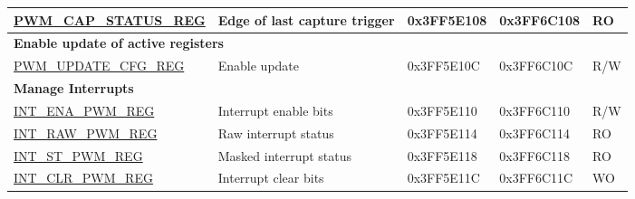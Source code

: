 \begin{longtable}{ | p{5.5cm} | p{5.7cm} | p{2cm} | p{2cm} | p{0.8cm} | }
\hyperref[regdesc:PWMCAPSTATUSREG]{PWM\_CAP\_STATUS\_REG} & Edge of last capture trigger & 0x3FF5E108 & 0x3FF6C108 & RO \\ \hline
\multicolumn{5}{|l|}{\textbf{Enable update of active registers}} \\ \hline
\hyperref[regdesc:PWMUPDATECFGREG]{PWM\_UPDATE\_CFG\_REG} & Enable update & 0x3FF5E10C & 0x3FF6C10C & R/W \\ \hline
\multicolumn{5}{|l|}{\textbf{Manage Interrupts}} \\ \hline
\hyperref[regdesc:INTENAPWMREG]{INT\_ENA\_PWM\_REG} & Interrupt enable bits & 0x3FF5E110 & 0x3FF6C110 & R/W \\ \hline
\hyperref[regdesc:INTRAWPWMREG]{INT\_RAW\_PWM\_REG} & Raw interrupt status & 0x3FF5E114 & 0x3FF6C114 & RO \\ \hline
\hyperref[regdesc:INTSTPWMREG]{INT\_ST\_PWM\_REG} & Masked interrupt status & 0x3FF5E118 & 0x3FF6C118 & RO \\ \hline
\hyperref[regdesc:INTCLRPWMREG]{INT\_CLR\_PWM\_REG} & Interrupt clear bits & 0x3FF5E11C & 0x3FF6C11C & WO \\ \hline
\end{longtable}

